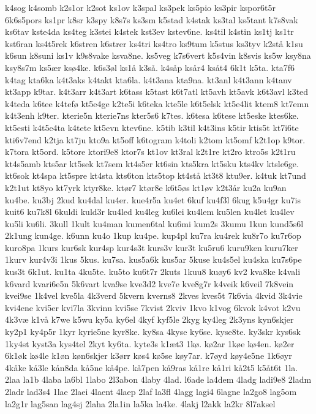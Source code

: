 {k4sog
k4somb
k2s1or
k2sot
ks1ov
k3spal
ks3pek
ks5pio
ks3pir
kspor6t5r
6k6s5pors
ks1pr
k8sr
k3spy
k8s7s
ks3sm
k5stad
k4stak
ks3tal
ks5tant
k7s8vak
ks6tav
kste4da
ks4teg
k3stei
k4stek
kst3ev
kstev6ne.
ks4til
k4stin
ks1tj
ks1tr
kst6ran
ks4t5rek
k6stren
k6strer
ks4tri
ks4tro
ks9tum
k5stus
ks3tyv
k2stå
k1su
k6sun
k8suni
ks1v
k9s8vake
ksva8ne.
ks5veg
k7s6vert
k5s4vin
k8svis
ks5w
ksy8na
ksy8s7m
ks5ær
ksø4ke.
k6s3øl
ks1å
k3så.
k4såp
ksår4
ksåt4
6k1t
k5ta.
kta7f6
k4tag
kta6ka
k4t3aks
k4takt
kta6la.
k4t3ana
kta9na.
kt3anl
k4t3ann
k4tanv
kt3app
k9tar.
k4t3arr
k4t3art
k6tass
k5tast
k6t7atl
kt5avh
kt5avk
k6t3avl
k3ted
k4teda
k6tee
k4tefø
kt5e4ge
k2te5i
k6teka
kte5le
k6t5elsk
kt5e4lit
ktem8
kt7emn
k4t3enh
k9ter.
kterie5n
kterie7ns
kter5s6
k7tes.
k6tesa
k6tese
kt5eske
ktes6ke.
kt5esti
k4t5e4ta
k4tete
kt5evn
ktev6ne.
k5tib
k3til
k4t3ins
k5tir
ktis5t
kt7i6te
kti6v7end
k2tja
kt7ju
kto9a
kt5off
k6togram
k4toli
k2tom
kt5omf
k2t1op
k9tor.
k7tora
kt5ord.
k5tore
ktori9e8
ktor7s
kt1ov
kt3ral
k2t1re
kt2ro
ktro5s
k2t1ru
kt4s5amb
kts5ar
kt5sek
kt7sem
kt4s5er
kt6sin
kts5kra
kt5sku
kts4kv
ktsle6ge.
kt6sok
kt4spa
kt5spre
kt4sta
kts6ton
kts5top
kt4stå
kt3t8
ktu9er.
k4tuk
kt7und
k2t1ut
kt8yo
kt7yrk
ktyr8ke.
ktør7
ktør8e
k6t5øs
kt1øv
k2t3år
ku2a
ku9an
ku4be.
ku3bj
2kud
ku4dal
ku4er.
kue4r5a
ku4et
6kuf
ku4f3l
6kug
k5u4gr
ku7is
kuit6
ku7k8l
6kuldi
kuld3r
ku4led
ku4leg
ku6lei
ku4lem
ku5len
ku4let
ku4lev
ku5li
ku6li.
3kull
1kult
ku4man
kumen6tal
ku6mi
kum2s
3kumu
1kun
kund5s6l
2k1ung
kun4ge.
k6unn
ku4o
1kup
ku4pe.
kup4pl
ku7ra
ku4rek
ku8r7o
ku7r6op
kuro8pa
1kurs
kur6sk
kur4sp
kur4s3t
kurs3v
kur3t
ku5ru6
kuru9ken
kuru7ker
1kurv
kur4v3i
1kus
5kus.
ku7sa.
kus5a6k
kus5ar
5kuse
ku4s5el
ku4ska
ku7s6pe
kus3t
6k1ut.
ku1ta
4ku5te.
ku5to
ku6t7r
2kuts
1kuu8
kuøy6
kv2
kva8ke
k4vali
k6vard
kvari6e5n
5k6vart
kva9se
kve3d2
kve7e
kve8g7r
k4veik
k6veil
7k8vein
kvei9se
1k4vel
kve5la
4k3verd
5kvern
kverns8
2kves
kves5t
7k6via
4kvid
3k4vie
kvi4ene
kvi5er
kvi7la
3kvinn
kvi5se
7kvist
2kviv
1kvo
k1vog
6kvok
k4vot
k2vu
4k3væ
k1vå
k7we
k5wu
ky5a
ky6el
4kyf
kyf5le
2kyg
ky4leg
2k3yns
kyn6skjer
ky2p1
ky4p5r
1kyr
kyrie5ne
kyr8ke.
ky8sa
4kyse
ky6se.
kyse8te.
ky3skr
kys6sk
1ky4st
kyst3a
kys4tel
2kyt
ky6ta.
kyte3s
k1æt3
1kø.
kø2ar
1køe
kø4en.
kø2er
6k1øk
kø4le
k1øn
køn6skjer
k3ørr
køs4
kø5se
køy7ar.
k7øyd
køy4e5ne
1k6øyr
4kåke
kå3le
kån8da
kå5ne
kå4pe.
kå7pen
kå9ras
kå1re
kå1ri
kå2t5
k5åt6t
1la.
2laa
la1b
4laba
la6bl
1labo
2l3abon
4laby
4lad.
l6ade
la4dem
4ladg
ladi9e8
2ladm
2ladr
lad3s4
1lae
2laei
4laent
4laep
2laf
la3fl
4lagg
lagi4
6lagne
la2go8
lag5om
la2g1r
lag5san
lag4sj
2laha
2la1in
la5ka
la4ke.
4lakj
l2akk
la2kr
8l7aksel
}
